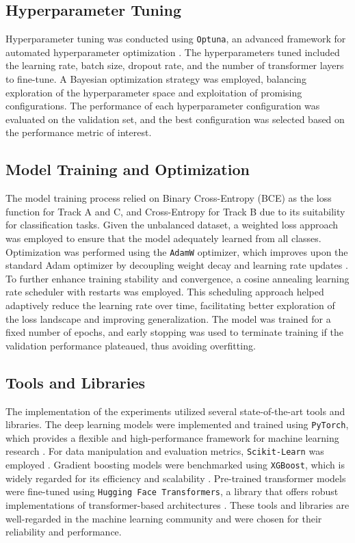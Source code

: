 \subsection{Hyperparameter Tuning}

Hyperparameter tuning was conducted using \texttt{Optuna}, an advanced framework for automated hyperparameter optimization \citep{Akiba2019Optuna}. The hyperparameters tuned included the learning rate, batch size, dropout rate, and the number of transformer layers to fine-tune. A Bayesian optimization strategy was employed, balancing exploration of the hyperparameter space and exploitation of promising configurations. The performance of each hyperparameter configuration was evaluated on the validation set, and the best configuration was selected based on the performance metric of interest.

\subsection{Model Training and Optimization}

The model training process relied on Binary Cross-Entropy (BCE) as the loss function for Track A and C, and Cross-Entropy for Track B due to its suitability for classification tasks. Given the unbalanced dataset, a weighted loss approach was employed to ensure that the model adequately learned from all classes. Optimization was performed using the \texttt{AdamW} optimizer, which improves upon the standard Adam optimizer by decoupling weight decay and learning rate updates \citep{Loshchilov2019AdamW}. To further enhance training stability and convergence, a cosine annealing learning rate scheduler with restarts was employed. This scheduling approach helped adaptively reduce the learning rate over time, facilitating better exploration of the loss landscape and improving generalization. The model was trained for a fixed number of epochs, and early stopping was used to terminate training if the validation performance plateaued, thus avoiding overfitting.

\subsection{Tools and Libraries}

The implementation of the experiments utilized several state-of-the-art tools and libraries. The deep learning models were implemented and trained using \texttt{PyTorch}, which provides a flexible and high-performance framework for machine learning research \citep{Paszke2019PyTorch}. For data manipulation and evaluation metrics, \texttt{Scikit-Learn} was employed \citep{Pedregosa2011ScikitLearn}. Gradient boosting models were benchmarked using \texttt{XGBoost}, which is widely regarded for its efficiency and scalability \citep{chen2016xgboost}. Pre-trained transformer models were fine-tuned using \texttt{Hugging Face Transformers}, a library that offers robust implementations of transformer-based architectures \citep{Wolf2019HuggingFace}. These tools and libraries are well-regarded in the machine learning community and were chosen for their reliability and performance.

